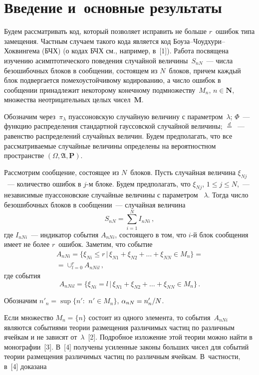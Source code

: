       \begin{multicols}{2}
      
            \label{st\stat}

  

\section{Введение и~основные результаты}

Будем рассматривать код, который позволяет исправить не больше 
$r$~ошибок типа замещения. Частным случаем такого кода является код Боу\-за--Чоуд\-ху\-ри--Хок\-вин\-ге\-ма
(БЧХ) (о кодах  БЧХ см., 
например, в~[1]). Работа посвящена изучению
асимптотического поведения  случайной величины~$S_{nN}$~--- чис\-ла
безошибочных блоков в сообщении, состоящем из $N$~блоков, причем
каждый блок подвергается помехоустойчивому кодированию, а число
ошибок в сообщении принадлежит некоторому конечному
 подмножеству~$M_n$, $n\in\mathbf{N}$, множества неотрицательных целых чисел~$\mathbf{M}$.

Обозначим через~$\pi_{\lambda}$ пуассоновскую случайную величину с
параметром~$\lambda$; $\Phi$~--- функцию распределения стандартной
гауссовской случайной величины; $\stackrel{d}{=}$~--- равенство
распределений случайных величин.
 Будем предполагать, что все рассматриваемые случайные величины определены на
вероятностном пространстве $(\Omega,
\mathfrak{A}, \mathbf{P})$.


 Рассмотрим  сообщение, состоящее из $N$~блоков. Пусть случайная величина $\xi_{Nj}$~--- 
 количество ошибок в $j$-м блоке. Будем предполагать, что  $\xi_{Nj}$, $1\le
j\le N$,~--- независимые пуассоновские случайные величины с
параметром~ $\lambda$.
  Тогда  число безошибочных  блоков в сообщении~--- случайная величина
$$
S_{nN}=\sum\limits_{i=1}^NI_{nNi}\,,
$$
где $I_{nNi}$~--- индикатор события $A_{nNi}$, состоящего в том, что
$i$-й блок  сообщения имеет не более $r$~ошибок. Заметим, что
событие
\begin{multline*} 
A_{nNi}=\{\xi_{Ni}\le r\, |\, \xi_{N1}+\xi_{N2}+ \dots +\xi_{NN}\in
M_n\}={}\\
{}=\cup_{l=0}^r A_{nNil}\,,
\end{multline*}
где   события
$$ 
A_{nNil}=\{\xi_{Ni}=l\, |\,
 \xi_{N1}+\xi_{N2}+ \dots +\xi_{NN}\in M_n\}\,.
$$

Обозначим $n'_n=\sup\{n':\ \, n'\in M_n\}$, $\alpha_{nN}\hm={n'_n}/{N}$.

Если множество $M_n=\{n\}$ состоит из одного элемента, то события~$A_{nNi}$ 
являются событиями теории размещения различимых частиц по
различным ячейкам и не зависят от~$\lambda$~[2]. Подробное изложение
этой теории  можно найти в монографии~[3]. В~[4] получены усиленные
законы больших чисел для событий теории размещения различимых частиц
по различным ячейкам. В~част\-ности, в~[4] доказана


\end{multicols}
